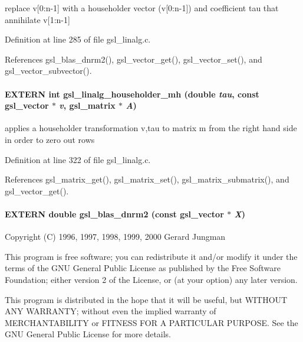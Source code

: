 replace v[0:n-1] with a householder vector (v[0:n-1]) and coefficient tau that annihilate v[1:n-1] 

Definition at line 285 of file gsl\_\-linalg.c.

References gsl\_\-blas\_\-dnrm2(), gsl\_\-vector\_\-get(), gsl\_\-vector\_\-set(), and gsl\_\-vector\_\-subvector().
\paragraph[gsl\_\-linalg\_\-householder\_\-mh]{\setlength{\rightskip}{0pt plus 5cm}EXTERN int gsl\_\-linalg\_\-householder\_\-mh (double {\em tau}, \/  const gsl\_\-vector $\ast$ {\em v}, \/  gsl\_\-matrix $\ast$ {\em A})}\hfill\label{group__nr_g43bd6720126e242cfbd3f8dbbbe5d869}




applies a householder transformation v,tau to matrix m from the right hand side in order to zero out rows 

Definition at line 322 of file gsl\_\-linalg.c.

References gsl\_\-matrix\_\-get(), gsl\_\-matrix\_\-set(), gsl\_\-matrix\_\-submatrix(), and gsl\_\-vector\_\-get().
\paragraph[gsl\_\-blas\_\-dnrm2]{\setlength{\rightskip}{0pt plus 5cm}EXTERN double gsl\_\-blas\_\-dnrm2 (const gsl\_\-vector $\ast$ {\em X})}\hfill\label{group__nr_gaf8552fa49313fe61190283f4c6d7a5b}




Copyright (C) 1996, 1997, 1998, 1999, 2000 Gerard Jungman

This program is free software; you can redistribute it and/or modify it under the terms of the GNU General Public License as published by the Free Software Foundation; either version 2 of the License, or (at your option) any later version.

This program is distributed in the hope that it will be useful, but WITHOUT ANY WARRANTY; without even the implied warranty of MERCHANTABILITY or FITNESS FOR A PARTICULAR PURPOSE. See the GNU General Public License for more details.

